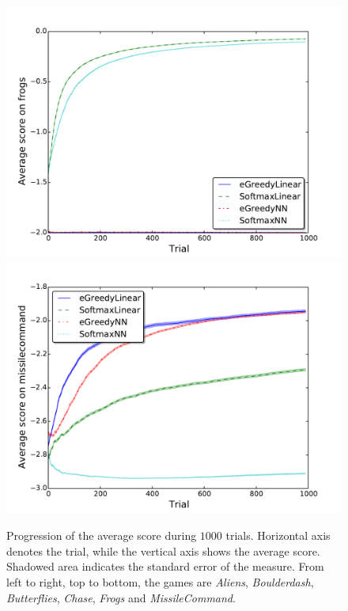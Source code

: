 \documentclass[conference]{IEEEtran}
\begin{document}
\begin{figure}[!t]
\begin{center}
	\includegraphics[width = .45\textwidth]{img/frogs_scores}
	\includegraphics[width = .45\textwidth]{img/missilecommand_scores}\\

	\caption{Progression of the average score during $1000$ trials. Horizontal axis denotes the trial, while the vertical axis shows the average score. Shadowed area indicates the standard error of the measure. From left to right, top to bottom, the games are \textit{Aliens}, \textit{Boulderdash}, \textit{Butterflies}, \textit{Chase}, \textit{Frogs} and \textit{MissileCommand}.}
	\label{fig:results1}
	\end{center}
\end{figure}
\end{document}
